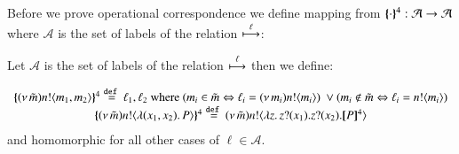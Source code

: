 Before we prove operational correspondence we
define mapping from $\{\!\!\{\cdot\}\!\!\}^{4}: \mathcal{A} \to \mathcal{A}$
where $\mathcal{A}$ is the set of labels of the relation
$\stackrel{\ell}{\longmapsto}$:
\begin{definition}\rm
	Let $\mathcal{A}$ is the set of labels of the relation
	$\stackrel{\ell}{\longmapsto}$ then we define:

\[
	\begin{array}{c}
		\mapa{\news{\tilde{m}} \bactout{n}{m_1,  m_2}}^4 
		\defeq \ell_1, \ell_2
		\textrm{ where }
			(m_i \in \tilde{m} \Leftrightarrow \ell_i = \news{m_i}\bactout{n}{m_i} ) ~ \lor %
			(m_i \not\in \tilde{m} \Leftrightarrow  \ell_i = \bactout{n}{m_i})
		\\
		\mapa{\news{\tilde{m}} \bactout{n}{\abs{(x_1, x_2)}{P}} }^4 
		\defeq
		\news{\tilde{m}} \bactout{n}{\abs{z}\binp{z}{x_1} \binp{z}{x_2} \map{P}^{4}}
	\end{array}
\]
	and homomorphic for all other cases of $\ell \in \mathcal{A}$.
\end{definition}


